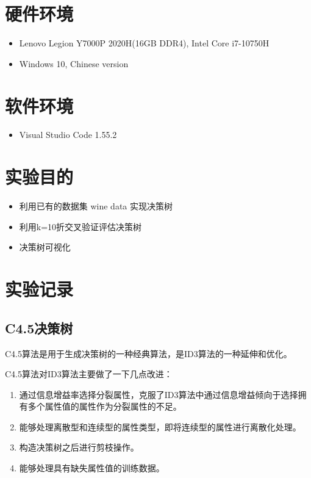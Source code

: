 \documentclass{sdureport}
\begin{document}
\begin{sduDocument}	

	\section{硬件环境}
	\begin{itemize}[leftmargin=1em] 
		\item Lenovo Legion Y7000P 2020H(16GB DDR4), Intel Core i7-10750H
		\item Windows 10, Chinese version
	\end{itemize}

	\section{软件环境}
	\begin{itemize}[leftmargin=1em] 
		\item Visual Studio Code 1.55.2
	\end{itemize}
	
	\section{实验目的}
	
	\begin{itemize}[leftmargin=1em]
		\item 利用已有的数据集 wine data 实现决策树
		\item 利用k=10折交叉验证评估决策树
		\item 决策树可视化
	\end{itemize}

	\section{实验记录}
	
	\subsection{C4.5决策树}

	C4.5算法是用于生成决策树的一种经典算法，是ID3算法的一种延伸和优化。

	C4.5算法对ID3算法主要做了一下几点改进：
	\begin{enumerate}
		\item 通过信息增益率选择分裂属性，克服了ID3算法中通过信息增益倾向于选择拥有多个属性值的属性作为分裂属性的不足。
		\item 能够处理离散型和连续型的属性类型，即将连续型的属性进行离散化处理。
		\item 构造决策树之后进行剪枝操作。
		\item 能够处理具有缺失属性值的训练数据。
	\end{enumerate}


\end{sduDocument}
\end{document}
